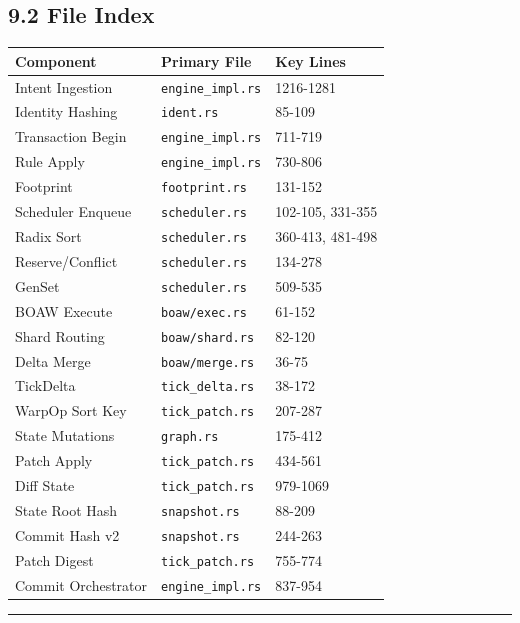 \documentclass[
]{book}
\newcounter{none} %
\begin{document}
\subsection{9.2 File Index}\label{file-index}

{\def\LTcaptype{none} %
\begin{longtable}[]{@{}lll@{}}
\toprule\noalign{}
Component & Primary File & Key Lines \\
\midrule\noalign{}
\endhead
\bottomrule\noalign{}
\endlastfoot
Intent Ingestion & \texttt{engine\_impl.rs} & 1216-1281 \\
Identity Hashing & \texttt{ident.rs} & 85-109 \\
Transaction Begin & \texttt{engine\_impl.rs} & 711-719 \\
Rule Apply & \texttt{engine\_impl.rs} & 730-806 \\
Footprint & \texttt{footprint.rs} & 131-152 \\
Scheduler Enqueue & \texttt{scheduler.rs} & 102-105, 331-355 \\
Radix Sort & \texttt{scheduler.rs} & 360-413, 481-498 \\
Reserve/Conflict & \texttt{scheduler.rs} & 134-278 \\
GenSet & \texttt{scheduler.rs} & 509-535 \\
BOAW Execute & \texttt{boaw/exec.rs} & 61-152 \\
Shard Routing & \texttt{boaw/shard.rs} & 82-120 \\
Delta Merge & \texttt{boaw/merge.rs} & 36-75 \\
TickDelta & \texttt{tick\_delta.rs} & 38-172 \\
WarpOp Sort Key & \texttt{tick\_patch.rs} & 207-287 \\
State Mutations & \texttt{graph.rs} & 175-412 \\
Patch Apply & \texttt{tick\_patch.rs} & 434-561 \\
Diff State & \texttt{tick\_patch.rs} & 979-1069 \\
State Root Hash & \texttt{snapshot.rs} & 88-209 \\
Commit Hash v2 & \texttt{snapshot.rs} & 244-263 \\
Patch Digest & \texttt{tick\_patch.rs} & 755-774 \\
Commit Orchestrator & \texttt{engine\_impl.rs} & 837-954 \\
\end{longtable}
}

\begin{center}\rule{0.5\linewidth}{0.5pt}\end{center}
\end{document}
